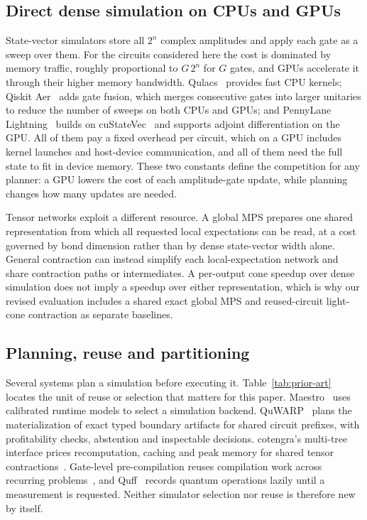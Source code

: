 \subsection{Direct dense simulation on CPUs and GPUs}
State-vector simulators store all $2^n$ complex amplitudes and apply each gate as a sweep over them. For the circuits considered here the cost is dominated by memory traffic, roughly proportional to $G\,2^n$ for $G$ gates, and GPUs accelerate it through their higher memory bandwidth. Qulacs~\cite{suzuki2021qulacs} provides fast CPU kernels; Qiskit Aer~\cite{javadi2024qiskit} adds gate fusion, which merges consecutive gates into larger unitaries to reduce the number of sweeps on both CPUs and GPUs; and PennyLane Lightning~\cite{asadi2024lightning} builds on cuStateVec~\cite{bayraktar2023cuquantum} and supports adjoint differentiation on the GPU. All of them pay a fixed overhead per circuit, which on a GPU includes kernel launches and host-device communication, and all of them need the full state to fit in device memory. These two constants define the competition for any planner: a GPU lowers the cost of each amplitude-gate update, while planning changes how many updates are needed.

Tensor networks exploit a different resource. A global MPS prepares one shared representation from which all requested local expectations can be read, at a cost governed by bond dimension rather than by dense state-vector width alone. General contraction can instead simplify each local-expectation network and share contraction paths or intermediates. A per-output cone speedup over dense simulation does not imply a speedup over either representation, which is why our revised evaluation includes a shared exact global MPS and reused-circuit light-cone contraction as separate baselines.

\subsection{Planning, reuse and partitioning}
Several systems plan a simulation before executing it. Table~\ref{tab:prior-art} locates the unit of reuse or selection that matters for this paper. Maestro~\cite{bertomeu2025maestro} uses calibrated runtime models to select a simulation backend. QuWARP~\cite{littau2026quwarp} plans the materialization of exact typed boundary artifacts for shared circuit prefixes, with profitability checks, abstention and inspectable decisions. cotengra's multi-tree interface prices recomputation, caching and peak memory for shared tensor contractions~\cite{cotengramulti}. Gate-level pre-compilation reuses compilation work across recurring problems~\cite{quetschlich2023precompilation}, and Quff~\cite{quff2024} records quantum operations lazily until a measurement is requested. Neither simulator selection nor reuse is therefore new by itself.

